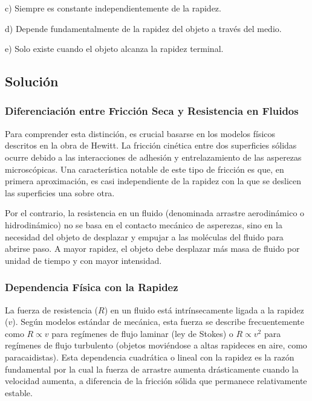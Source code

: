 \documentclass[12pt]{article}
\begin{document}
c) Siempre es constante independientemente de la rapidez.

d) Depende fundamentalmente de la rapidez del objeto a través del medio.

e) Solo existe cuando el objeto alcanza la rapidez terminal.

\subsection*{Solución}

\subsubsection*{Diferenciación entre Fricción Seca y Resistencia en Fluidos}
Para comprender esta distinción, es crucial basarse en los modelos físicos descritos en la obra de Hewitt. La fricción cinética entre dos superficies sólidas ocurre debido a las interacciones de adhesión y entrelazamiento de las asperezas microscópicas. Una característica notable de este tipo de fricción es que, en primera aproximación, es casi independiente de la rapidez con la que se deslicen las superficies una sobre otra.

Por el contrario, la resistencia en un fluido (denominada arrastre aerodinámico o hidrodinámico) no se basa en el contacto mecánico de asperezas, sino en la necesidad del objeto de desplazar y empujar a las moléculas del fluido para abrirse paso. A mayor rapidez, el objeto debe desplazar más masa de fluido por unidad de tiempo y con mayor intensidad.

\subsubsection*{Dependencia Física con la Rapidez}
La fuerza de resistencia ($R$) en un fluido está intrínsecamente ligada a la rapidez ($v$). Según modelos estándar de mecánica, esta fuerza se describe frecuentemente como $R \propto v$ para regímenes de flujo laminar (ley de Stokes) o $R \propto v^2$ para regímenes de flujo turbulento (objetos moviéndose a altas rapideces en aire, como paracaidistas). Esta dependencia cuadrática o lineal con la rapidez es la razón fundamental por la cual la fuerza de arrastre aumenta drásticamente cuando la velocidad aumenta, a diferencia de la fricción sólida que permanece relativamente estable.
\end{document}

